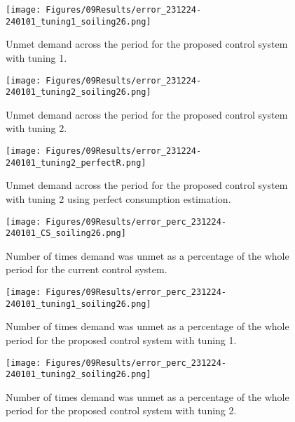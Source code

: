 \begin{figure}[h]
    \centering
    \texttt{[image: Figures/09Results/error\_231224-240101\_tuning1\_soiling26.png]}
    \caption[Unmet demand proposed control system 1]{Unmet demand across the period for the proposed control system with tuning 1. }
    \label{fig:error_231224-240101_tuning1_soiling26}
\end{figure}

\begin{figure}[h]
    \centering
    \texttt{[image: Figures/09Results/error\_231224-240101\_tuning2\_soiling26.png]}
    \caption[Unmet demand proposed control system 2]{Unmet demand across the period for the proposed control system with tuning 2. }
    \label{fig:error_231224-240101_tuning2_soiling26}
\end{figure}

\begin{figure}[h]
    \centering
    \texttt{[image: Figures/09Results/error\_231224-240101\_tuning2\_perfectR.png]}
    \caption[Unmet demand proposed control system 2 perfect R]{Unmet demand across the period for the proposed control system with tuning 2 using perfect consumption estimation. }
    \label{fig:error_231224-240101_tuning2_perfectR}
\end{figure}

\begin{figure}[h]
    \centering
    \texttt{[image: Figures/09Results/error\_perc\_231224-240101\_CS\_soiling26.png]}
    \caption[Unmet demand portion current control system]{Number of times demand was unmet as a percentage of the whole period for the current control system. }
    \label{fig:error_perc_231224-240101_CS_soiling26}
\end{figure}

\begin{figure}[h]
    \centering
    \texttt{[image: Figures/09Results/error\_perc\_231224-240101\_tuning1\_soiling26.png]}
    \caption[Unmet demand portion proposed control system 1]{Number of times demand was unmet as a percentage of the whole period for the proposed control system with tuning 1. }
    \label{fig:error_perc_231224-240101_tuning1_soiling26}
\end{figure}

\begin{figure}[h]
    \centering
    \texttt{[image: Figures/09Results/error\_perc\_231224-240101\_tuning2\_soiling26.png]}
    \caption[Unmet demand portion proposed control system 2]{Number of times demand was unmet as a percentage of the whole period for the proposed control system with tuning 2. }
    \label{fig:error_perc_231224-240101_tuning2_soiling26}
\end{figure}

